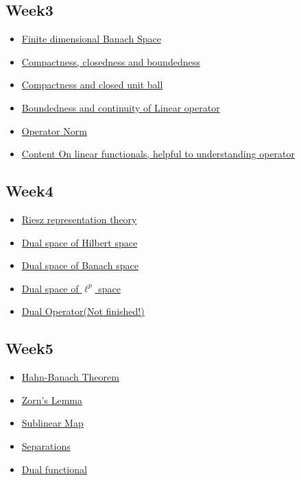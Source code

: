 \subsection{Week3}
\begin{itemize}
	\item \hyperref[finite dimensional Banach]{Finite dimensional Banach Space}

	\item \hyperref[compactness]{Compactness, closedness and boundedness}
	\item \hyperref[compact unit balls]{Compactness and closed unit ball}
	\item \hyperref[continuity of LO]{Boundedness and continuity of Linear operator}
	\item \hyperref[operator norm]{Operator Norm}
	\item \hyperref[Linear Functionals]{\color{red}Content On linear functionals, helpful to understanding operator}
\end{itemize}

\subsection{Week4}
\begin{itemize}
	\item \hyperref[Riesz representation theory]{Riesz representation theory}
	\item \hyperref[dual space Hilbert]{Dual space of Hilbert space}
	\item \hyperref[dual space Banach]{Dual space of Banach space}
	\item \hyperref[lp dual]{Dual space of $\ell^p$ space}
	\item \hyperref[dual operator]{Dual Operator(Not finished!)}
\end{itemize}

\subsection{Week5}
\begin{itemize}
	\item \hyperref[Hahn-Banach Theorem]{Hahn-Banach Theorem}
	\item \hyperref[Zorn's Lemma]{Zorn's Lemma}
	\item \hyperref[sublinear map]{Sublinear Map}
	\item \hyperref[separations]{Separations}
	\item \hyperref[Dual functional]{Dual functional}
\end{itemize}




